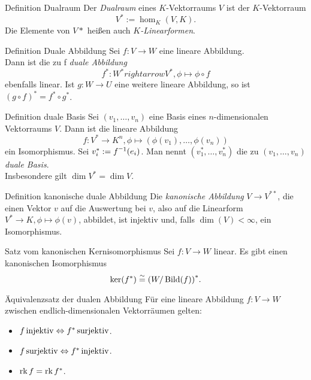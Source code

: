 \documentclass[main.tex]{subfiles}
\begin{document}
\begin{karte}{Definition Dualraum}
    Der \textit{Dualraum} eines \(K\)-Vektorraums \(V\) ist der 
    \(K\)-Vektorraum 
    \[ V^* := \hom_K(V,K). \]
    Die Elemente von \(V*\) heißen auch \textit{\(K\)-Linearformen}.
\end{karte}
\begin{karte}{Definition Duale Abbildung}
    Sei \( f : V \rightarrow W \) eine lineare Abbildung.\\
    Dann ist die zu f \textit{duale Abbildung}
    \[ f^* : W^* rightarrow V^*, \phi \mapsto \phi \circ f \]
    ebenfalls linear.
    Ist \(g: W \rightarrow U\) eine weitere lineare Abbildung,
    so ist \({(g \circ f)}^* = f^* \circ g^* \).    
\end{karte}
\begin{karte}{Definition duale Basis}
    Sei \( (v_1, \ldots, v_n) \) eine Basis eines 
    \(n\)-dimensionalen Vektorraums \(V\). Dann ist 
    die lineare Abbildung 
    \[ f : V^* \rightarrow K^n, 
    \phi \mapsto (\phi(v_1), \ldots, \phi(v_n)) \]
    ein Isomorphismus. Sei \( v_i^* := \inverse{f}(e_i) \). 
    Man nennt \( (v_1^*, \ldots, v_n^*) \) die zu 
    \( (v_1, \ldots, v_n) \) \textit{duale Basis}.\\
    Insbesondere gilt \( \dim V^* = \dim V \).
\end{karte}
\begin{karte}{Definition kanonische duale Abbildung}
    Die \textit{kanonische Abbildung} \( V \rightarrow V^{**} \),
    die einen Vektor \(v\) auf die Auswertung bei \(v\), also auf die 
    Linearform \( V^* \rightarrow K, \phi \mapsto \phi(v)\), abbildet,
    ist injektiv und, falls \(\dim(V) < \infty \), ein Isomorphismus.
\end{karte}
\begin{karte}{Satz vom kanonischen Kernisomorphismus}%
    Sei \( f: V \rightarrow W \) linear. Es gibt einen kanonischen 
    Isomorphismus 
    \[ \ker(f^*) \overset{\sim}{=} {(W/\operatorname{Bild}(f))}^*. \]
\end{karte}
\begin{karte}{Äquivalenzsatz der dualen Abbildung}
    Für eine lineare Abbildung \( f: V \rightarrow W \) 
    zwischen endlich-dimensionalen Vektorräumen gelten:
    \begin{itemize}
        \item \( f \operatorname{injektiv} \Leftrightarrow f^* \operatorname{surjektiv} \).
        \item \( f \operatorname{surjektiv} \Leftrightarrow f^* \operatorname{injektiv} \).
        \item \( \operatorname{rk} f = \operatorname{rk} f^* \).
    \end{itemize}
\end{karte}
\end{document}
